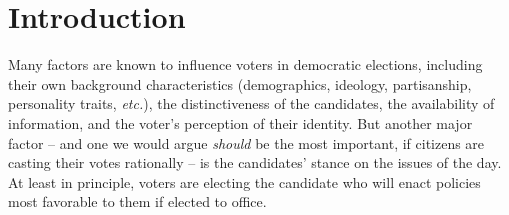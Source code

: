 \section{Introduction}
\label{sec:intro}

Many factors are known to influence voters in democratic elections, including
their own background characteristics (demographics, ideology, partisanship,
personality traits, \textit{etc.}), the distinctiveness of the candidates, the
availability of information, and the voter's perception of their
identity.\cite[pp.3-4]{redlawsk_citizens_2020} But another major factor -- and
one we would argue \textit{should} be the most important, if citizens are
casting their votes rationally -- is the candidates' stance on the issues of
the day. At least in principle, voters are electing the candidate who will
enact policies most favorable to them if elected to office.


